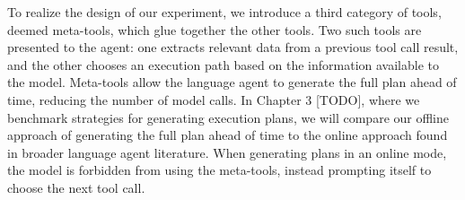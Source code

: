 \pskip

To realize the design of our experiment, we introduce a third category of tools, deemed meta-tools, which glue together the other tools. Two such tools are presented to the agent: one extracts relevant data from a previous tool call result, and the other chooses an execution path based on the information available to the model. Meta-tools allow the language agent to generate the full plan ahead of time, reducing the number of model calls. In Chapter 3 [TODO], where we benchmark strategies for generating execution plans, we will compare our offline approach of generating the full plan ahead of time to the online approach found in broader language agent literature. When generating plans in an online mode, the model is forbidden from using the meta-tools, instead prompting itself to choose the next tool call.
